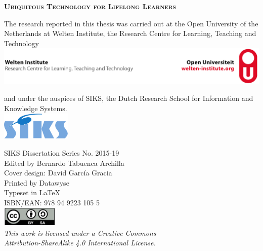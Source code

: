 \documentclass[normalheadings,tablecaptionabove,twoside,openright,chapterprefix,halfparskip,fontsize=10pt,numbers=noenddot]{scrbook} %
\begin{document}

\begin{titlepage}
	\null\vspace*{15.25em}
	\center
	\huge
	\textbf{\textsc{Ubiquitous Technology for Lifelong Learners}}\\
	\vfill\null
	
	\newpage
	\pagestyle{empty}
	\raggedright
	\normalsize
	The research reported in this thesis was carried out at the Open University of the Netherlands at Welten Institute, the Research Centre for Learning, Teaching and Technology\\
	\vspace*{1em}
	\center
	\includegraphics[width=1\textwidth]{figures/weltenlarge}
	\vspace*{1em}
	\raggedright
	and under the auspices of SIKS, the Dutch Research School for Information and Knowledge Systems.\\
	\vspace*{1em}
	\center
	\includegraphics[width=0.25\textwidth]{figures/siks-kleur}\\ %
	\vfill
	\raggedright
	SIKS Dissertation Series No. 2015-19 \\
	\vspace*{2em}
	Edited by Bernardo Tabuenca Archilla\\
	Cover design: David Garc\'ia Gracia\\	
	Printed by Datawyse\\
	Typeset in \LaTeX\\
	\vspace*{2em}
	ISBN/EAN: 978 94 9223 105 5\\
	\center
	\includegraphics[width=0.2\textwidth]{figures/ccbysa} \\
	\textit{This work is licensed under a Creative Commons\\Attribution-ShareAlike 4.0 International License.}
	\center
	

\end{titlepage}
\end{document}
